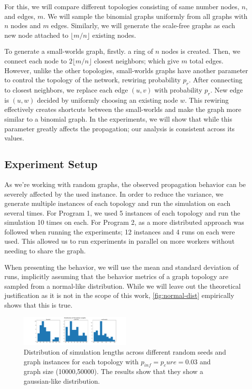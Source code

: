 \documentclass[conference]{IEEEtran}
\begin{document}
For this, we will compare different topologies consisting of same number nodes, $n$, and edges, $m$. We will sample the binomial graphs uniformly from all graphs with $n$ nodes and $m$ edges. Similarly, we will generate the scale-free graphs as each new node attached to $\lfloor m/n\rfloor$ existing nodes.

To generate a small-worlds graph, firstly. a ring of $n$ nodes is created. Then, we connect each node to $2\lfloor m/n\rfloor$ closest neighbors; which give $m$ total edges. However, unlike the other topologies, small-worlds graphs have another parameter to control the topology of the network, rewiring probability $p_r$. After connecting to closest neighbors, we replace each edge $(u,v)$ with probability $p_r$. New edge is $(u,w)$ decided by uniformly choosing an existing node $w$. This rewiring effectively creates shortcuts between the small-worlds and make the graph more similar to a binomial graph. In the experiments, we will show that while this parameter greatly affects the propagation; our analysis is consistent across its values.


\subsection{Experiment Setup}

As we're working with random graphs, the observed propagation behavior can be severely affected by the used instance. In order to reduce the variance, we generate multiple instances of each topology and run the simulation on each several times. For Program 1, we used 5 instances of each topology and run the simulation 10 times on each. For Program 2, as a more distributed approach was followed when running the experiments; 12 instances and 4 runs on each were used. This allowed us to run experiments in parallel on more workers without needing to share the graph.

When presenting the behavior, we will use the mean and standard deviation of runs, implicitly assuming that the behavior metrics of a graph topology are sampled from a normal-like distribution. While we will leave out the theoretical justification as it is not in the scope of this work, \autoref{fig:normal-dist} empirically shows that this is true.

\begin{figure}[htb]
  \begin{center}
	\includegraphics[width=0.5\textwidth]{img/distributions.pdf}
  \end{center}
	\caption{Distribution of simulation lengths across different random seeds and graph instances for each topology with $p_{inf} = p_cure = 0.03$ and graph size (10000,50000). The results show that they show a gaussian-like distribution.}
	\label{fig:normal-dist}
\end{figure}
\end{document}
